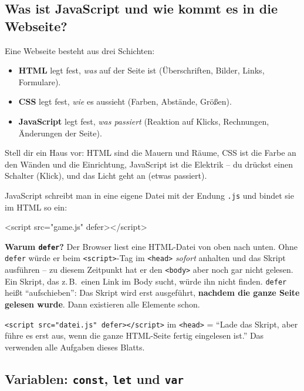 \documentclass[a4paper,11pt]{article}
\begin{document}
\subsection{Was ist JavaScript und wie kommt es in die Webseite?}

Eine Webseite besteht aus drei Schichten:
\begin{itemize}[nosep]
  \item \textbf{HTML} legt fest, \emph{was} auf der Seite ist (Überschriften, Bilder, Links, Formulare).
  \item \textbf{CSS} legt fest, \emph{wie} es aussieht (Farben, Abstände, Größen).
  \item \textbf{JavaScript} legt fest, \emph{was passiert} (Reaktion auf Klicks, Rechnungen, Änderungen der Seite).
\end{itemize}

\begin{analogie}
Stell dir ein Haus vor: HTML sind die Mauern und Räume, CSS ist die Farbe an den Wänden und die Einrichtung,
JavaScript ist die Elektrik -- du drückst einen Schalter (Klick), und das Licht geht an (etwas passiert).
\end{analogie}

JavaScript schreibt man in eine eigene Datei mit der Endung \texttt{.js} und bindet sie im HTML so ein:
\begin{htmlcode}[numbers=none]
<script src="game.js" defer></script>
\end{htmlcode}

\textbf{Warum \texttt{defer}?} Der Browser liest eine HTML-Datei von oben nach unten. Ohne \texttt{defer} würde er
beim \texttt{<script>}-Tag im \texttt{<head>} \emph{sofort} anhalten und das Skript ausführen -- zu diesem Zeitpunkt
hat er den \texttt{<body>} aber noch gar nicht gelesen. Ein Skript, das z.\,B.\ einen Link im Body sucht, würde ihn
nicht finden. \texttt{defer} heißt "`aufschieben"': Das Skript wird erst ausgeführt, \textbf{nachdem die ganze Seite
gelesen wurde}. Dann existieren alle Elemente schon.

\begin{merkbox}
\lstinline|<script src="datei.js" defer></script>| im \texttt{<head>} = "`Lade das Skript, aber führe es erst aus, wenn
die ganze HTML-Seite fertig eingelesen ist."' Das verwenden alle Aufgaben dieses Blatts.
\end{merkbox}

\subsection{Variablen: \texttt{const}, \texttt{let} und \texttt{var}}
\end{document}

